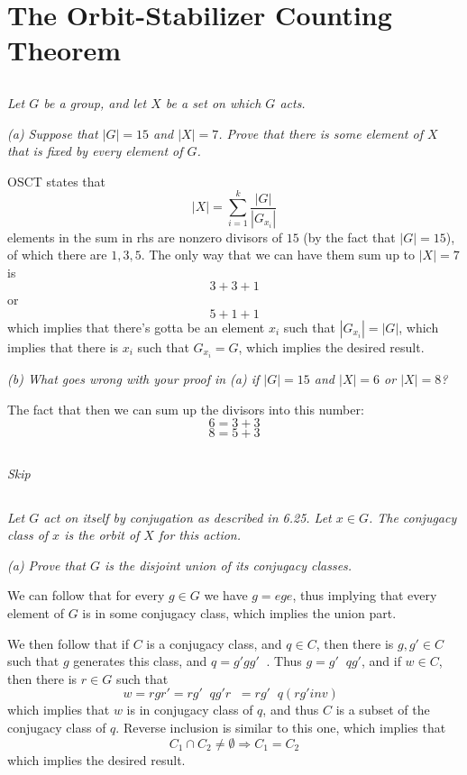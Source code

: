\documentclass[11pt,oneside,titlepage]{book}
\DeclareMathOperator \inv {^{-1}}
\DeclareMathOperator \ra {\Rightarrow}
\begin{document}
\section{The Orbit-Stabilizer Counting Theorem}

\subsection{}

\textit{Let $G$ be a group, and let $X$ be a set on which $G$ acts.}

\textit{(a) Suppose that $|G| = 15$ and $|X| = 7$. Prove that there is
  some element of $X$ that is fixed by every element of $G$.}

OSCT states that
$$|X| = \sum_{i = 1}^{k}{\frac{|G|}{|G_{x_i}|}}$$
elements in the sum in rhs are nonzero divisors of $15$ (by the fact
that $|G| = 15$), of which there are $1, 3, 5$. The only way that we
can have them sum up to $|X| = 7$ is
$$3 + 3 + 1$$
or
$$5 + 1 + 1$$
which implies that there's gotta be an element $x_i$ such that
$|G_{x_i}| = |G|$, which implies that there is $x_i$ such that
$G_{x_i} = G$, which implies the desired result.

\textit{(b) What goes wrong with your proof in (a) if $|G| = 15$ and
  $|X| = 6$ or $|X| = 8$?}

The fact that then we can sum up the divisors into this number:
$$6 = 3 + 3$$
$$8 = 5 + 3$$

\subsection{}

\textit{Skip}

\subsection{}

\textit{Let $G$ act on itself by conjugation as described in 6.25.
  Let $x \in G$. The conjugacy class of $x$ is the orbit of $X$ for this
  action.}

\textit{(a) Prove that $G$ is the disjoint union of its conjugacy classes.}

We can follow that for every $g \in G$ we have $g = e g e$, thus
implying that every element of $G$ is in some conjugacy class, which
implies the union part.

We then follow that if $C$ is a conjugacy class, and  $q \in C$,
then there is $g, g' \in C$ such that $g$ generates this class,
and $q = g' g g'\inv$. Thus $g = g'\inv q g'$, and if $w \in C$,
then there is $r \in G$ such that
$$w = r g r' = r g'\inv q g' r\inv = r g'\inv q (r g'inv)\inv $$
which implies that $w$ is in conjugacy class of $q$, and thus $C$
is a subset of the conjugacy class of $q$. Reverse inclusion is similar
to this one, which implies that
$$C_1 \cap C_2 \neq \emptyset \ra C_1 = C_2$$
which implies the desired result.
\end{document}

